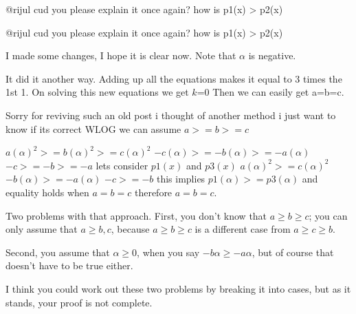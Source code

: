 \begin{solution}
	@rijul cud you please explain it once again? how is p1(x) > p2(x)
\end{solution}



\begin{solution}
	\begin{tcolorbox}@rijul cud you please explain it once again? how is p1(x) > p2(x)\end{tcolorbox}
I made some changes, I hope it is clear now. Note that $\alpha$ is negative.
\end{solution}



\begin{solution}
	It did it another way. 
Adding up all the equations makes it equal to 3 times the 1st 1. On solving this new equations we get $k$=0
Then we can easily get a=b=c.
\end{solution}



\begin{solution}
	Sorry for reviving such an old post i thought of another method i just want to know if its correct
WLOG we can assume $a>=b>=c$


$a(\alpha	)^2>=b(\alpha	)^2>=c(\alpha	)^2$ 
$-c(\alpha)>=-b(\alpha)>=-a(\alpha)$ 
 $-c>=-b>=-a$
lets consider $p1(x)$ and $p3(x)$
$a(\alpha )^2>=c(\alpha	)^2$
$-b(\alpha)>=-a(\alpha)$
$-c>=-b$
this implies $p1(\alpha)>=p3(\alpha)$ and equality holds when $a=b=c $
therefore $a=b=c$.
\end{solution}



\begin{solution}
	Two problems with that approach.  First, you don't know that $a\geq b\geq c$; you can only assume that $a\geq b, c$, because $a\geq b\geq c$ is a different case from $a\geq c\geq b$.

Second, you assume that $\alpha\geq0$, when you say $-b\alpha\geq-a\alpha$, but of course that doesn't have to be true either.

I think you could work out these two problems by breaking it into cases, but as it stands, your proof is not complete.
\end{solution}



